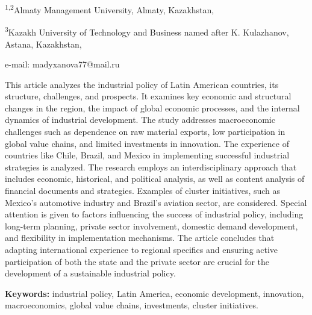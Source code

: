 \begin{affiliation}
\textsuperscript{1,2}Almaty Management University, Almaty, Kazakhstan,

\textsuperscript{3}Kazakh University of Technology and Business named after K. Kulazhanov, Astana, Kazakhstan,

e-mail: madyxanova77@mail.ru
\end{affiliation}

This article analyzes the industrial policy of Latin American countries,
its structure, challenges, and prospects. It examines key economic and
structural changes in the region, the impact of global economic
processes, and the internal dynamics of industrial development. The
study addresses macroeconomic chal\-lenges such as dependence on raw
material exports, low participation in global value chains, and limited
investments in innovation. The experience of countries like Chile,
Brazil, and Mexico in implementing successful industrial strategies is
analyzed. The research employs an interdisciplinary approach that
includes economic, historical, and political analysis, as well as
content analysis of financial documents and strategies. Examples of
cluster initiatives, such as Mexico's automotive industry and Brazil's
aviation sector, are considered. Special attention is given to factors
influencing the success of industrial policy, including long-term
planning, private sector involvement, domestic demand development, and
flexibility in implementation mechanisms. The article concludes that
adapting international experience to regional specifics and ensuring
active participation of both the state and the private sector are
crucial for the development of a sustainable industrial policy.

{\bfseries Keywords:} industrial policy, Latin America, economic
development, innovation, macroeconomics, glo\-bal value chains,
investments, cluster initiatives.

